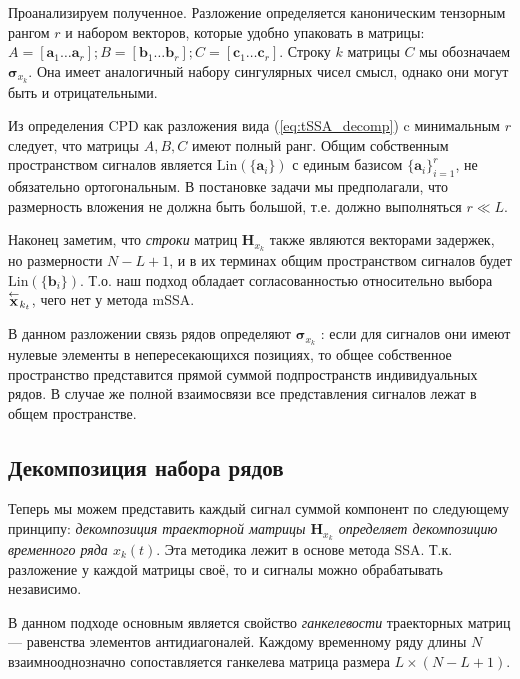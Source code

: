 	    	Проанализируем полученное. Разложение определяется каноническим тензорным рангом $ r $ и набором векторов, которые удобно упаковать в матрицы: $ A = [\mathbf{a}_1 \ldots \mathbf{a}_r]; B = [\mathbf{b}_1 \ldots \mathbf{b}_r]; C = [\mathbf{c}_1 \ldots \mathbf{c}_r] $. Строку $ k $ матрицы $ C $ мы обозначаем $ \boldsymbol{\sigma}_{x_k} $. Она имеет аналогичный набору сингулярных чисел смысл, однако они могут быть и отрицательными.
	    	
	    	Из определения CPD как разложения вида (\ref{eq:tSSA_decomp}) c минимальным $ r $ следует, что матрицы $ A, B, C $ имеют полный ранг. Общим собственным пространством сигналов является $ \text{Lin}(\{\mathbf{a}_i\}) $ с единым базисом $ \{\mathbf{a}_i\}_{i = 1}^r $, не обязательно ортогональным. В постановке задачи мы предполагали, что размерность вложения не должна быть большой, т.е. должно выполняться $ r \ll L $.
	    	
	    	Наконец заметим, что \emph{строки} матриц $ \mathbf{H}_{x_k} $ также являются векторами задержек, но размерности $ N - L + 1 $, и в их терминах общим пространством сигналов будет $ \text{Lin}(\{\mathbf{b}_i\}) $. Т.о. наш подход обладает согласованностью относительно выбора $ \overset{\leftarrow}{\mathbf{x}}_{k_t} $, чего нет у метода mSSA.
	    	
	    	В данном разложении связь рядов определяют $ \boldsymbol{\sigma}_{x_k} $ : если для сигналов они имеют нулевые элементы в непересекающихся позициях, то общее собственное пространство представится прямой суммой подпространств индивидуальных рядов. В случае же полной взаимосвязи все представления сигналов лежат в общем пространстве.
	    	
	    \subsection*{Декомпозиция набора рядов}\label{sec:decomposition}
	    
	    	Теперь мы можем представить каждый сигнал суммой компонент по следующему принципу: \emph{декомпозиция траекторной матрицы $ \mathbf{H}_{x_k} $ определяет декомпозицию временного ряда $ x_k(t) $}. Эта методика лежит в основе метода SSA. Т.к. разложение у каждой матрицы своё, то и сигналы можно обрабатывать независимо.
	    	
	    	В данном подходе основным является свойство \emph{ганкелевости} траекторных матриц --- равенства элементов антидиагоналей. Каждому временному ряду длины $ N $ взаимнооднозначно сопоставляется ганкелева матрица размера $ L \times (N - L + 1) $.
	    	
